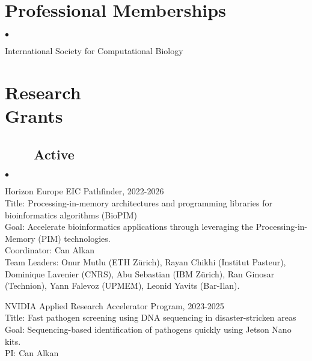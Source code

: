 \documentclass[margin,line]{res}
\newenvironment{list2}{
  \begin{list}{$\bullet$}{%
      \setlength{\itemsep}{0.1cm}
      \setlength{\parsep}{0in} \setlength{\parskip}{0in}
      \setlength{\topsep}{0in} \setlength{\partopsep}{0in} 
      \setlength{\leftmargin}{0.2in}}}{\end{list}}
\newenvironment{list4}{
  \begin{list}{$\bullet$}{%
      \setlength{\itemsep}{0cm}
      \setlength{\parsep}{0in} \setlength{\parskip}{0in}
      \setlength{\topsep}{0in} \setlength{\partopsep}{0in} 
      \setlength{\leftmargin}{0.2in}}}{\end{list}}
\begin{document}
\begin{resume}
\vspace*{-.2cm}
\section{\sc Professional Memberships}
\begin{list4}
\item 
  International Society for Computational Biology%
\end{list4}


          \section{\sc Research \\ Grants}
                                       \vspace{-0.4cm}
                                       \subsection{\small \sc ~~~~Active}
  \begin{list2}
    \item
    Horizon Europe EIC Pathfinder, 2022-2026\\
    Title: Processing-in-memory architectures and programming libraries for bioinformatics algorithms (BioPIM)\\
    Goal: Accelerate bioinformatics applications through leveraging the Processing-in-Memory (PIM) technologies.\\
    Coordinator: Can Alkan\\
    Team Leaders: Onur Mutlu (ETH Zürich), Rayan Chikhi (Institut Pasteur), Dominique Lavenier (CNRS), Abu Sebastian (IBM Zürich), Ran Ginosar (Technion), Yann Falevoz (UPMEM), Leonid Yavits (Bar-Ilan).
    
   \item
   NVIDIA Applied Research Accelerator Program, 2023-2025\\
   Title: Fast pathogen screening using DNA sequencing in disaster-stricken areas\\
   Goal: Sequencing-based identification of pathogens quickly using Jetson Nano kits.\\
   PI: Can Alkan

  \end{list2}



\end{resume}
\end{document}
